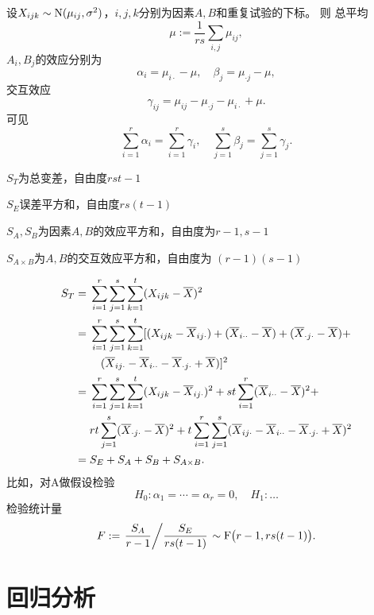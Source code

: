 设$X_{ijk}\sim\operatorname{N}(\mu_{ij},\sigma^2)$，$i, j, k $分别为因素$ A, B $和重复试验的下标。
则
总平均
\[
	\mu:=\frac1{rs}\sum_{i,j}\mu_{ij},
\]
$A_i,B_j$的效应分别为
\[
	\alpha_i=\mu_{i\cdot}-\mu,\quad\beta_j=\mu_{\cdot j}-\mu,
\]
交互效应
\[
	\gamma_{ij}=\mu_{ij}-\mu_{\cdot j}-\mu_{i\cdot}+\mu.
\]
可见
\[
	\sum_{i=1}^r\alpha_i=\sum_{i=1}^r\gamma_i,\quad\sum_{j=1}^s\beta_j=\sum_{j=1}^s\gamma_j.
\]
\begin{compactitem}
	\item $S_T$为总变差，自由度$rst-1$
	\item $S_E$误差平方和，自由度$rs(t-1)$
	\item $S_A,S_B$为因素$ A, B $的效应平方和，自由度为$ r - 1, s - 1$
	\item $S_{A\times B}$为$A,B$的交互效应平方和，自由度为 $(r - 1)(s - 1)$
\end{compactitem}
\begin{align}\notag
	S_T={}& \sum_{i=1}^r \sum_{j=1}^s \sum_{k=1}^t(X_{i j k}-\overline{X})^2 \\\notag
	={}& \sum_{i=1}^r \sum_{j=1}^s \sum_{k=1}^t[(X_{i j k}-\overline{X}_{i j \cdot})+(\overline{X}_{i\cdot\cdot}-\overline{X})+(\overline{X}_{\cdot j \cdot}-\overline{X})+\\\notag
	&\quad(\overline{X}_{i j \cdot}-\overline{X}_{i \cdot\cdot}-\overline{X}_{\cdot j \cdot}+\overline{X})]^2 \\\notag
	={}& \sum_{i=1}^r \sum_{j=1}^s \sum_{k=1}^t(X_{i j k}-\overline{X}_{i j \cdot})^2+s t \sum_{i=1}^r(\overline{X}_{i\cdot\cdot}-\overline{X})^2+ \\\notag
	& r t \sum_{j=1}^s(\overline{X}_{\cdot j \cdot}-\overline{X})^2+t \sum_{i=1}^r \sum_{j=1}^s(\overline{X}_{i j \cdot}-\overline{X}_{i\cdot\cdot}-\overline{X}_{\cdot j \cdot}+\overline{X})^2\\
	={}&S_E+S_A+S_B+S_{A\times B}.
\end{align}
比如，对A做假设检验
\[
	H_0:\alpha_1=\cdots=\alpha_r=0,\quad H_1:\ldots
\]
检验统计量 
\[
	F:=\left.{\frac{S_A}{r-1}}\middle/{\frac{S_E}{rs(t-1)}}\right.\sim\mathrm F\bigl(r-1,rs(t-1)\bigr).
\]

\section{回归分析}

